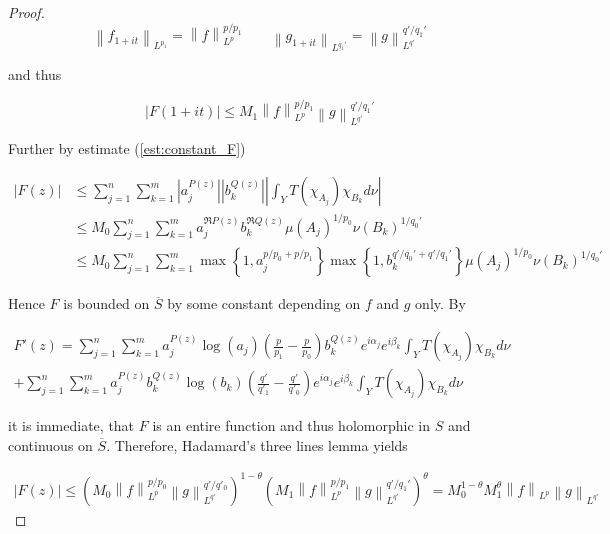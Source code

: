\begin{proof}
\begin{equation*}
	\left\|f_{1 + it}\right\|_{L^{p_1}} = \left\|f\right\|_{L^p}^{p/p_1} \qquad \left\|g_{1 + it}\right\|_{L^{q_1'}} = \left\|g\right\|_{L^{q'}}^{q'/q_1'}
\end{equation*}

and thus 
				
\begin{equation*}
	\left| F(1 + it)\right| \leqslant M_1 \left\|f\right\|_{L^p}^{p/p_1}\left\|g\right\|_{L^{q'}}^{q'/q_1'}
\end{equation*}	

Further by estimate (\ref{est:constant_F}) 

\begin{equation*}
	\begin{aligned}
		\left| F(z)\right| &\leqslant \sum_{j = 1}^n\sum_{k = 1}^m \left| a_j^{P(z)}\right| \left| b_k^{Q(z)}\right| \left| \int_Y T(\chi_{A_j})\chi_{B_k} d\nu\right|\\
		&\leqslant M_0\sum_{j = 1}^n\sum_{k = 1}^m a_j^{\Re P(z)}b_k^{\Re Q(z)}\mu\left(A_j\right)^{1/p_0}\nu\left(B_k\right)^{1/q_0'}\\
		&\leqslant M_0\sum_{j = 1}^n\sum_{k = 1}^m \max\left\{ 1, a_j^{p/p_0 + p/p_1}\right\} \max\left\{1,b_k^{q'/q_0' + q'/q_1'}\right\}\mu\left(A_j\right)^{1/p_0}\nu\left(B_k\right)^{1/q_0'}
	\end{aligned}
\end{equation*}


Hence $F$ is bounded on $\overline{S}$ by some constant depending on $f$ and $g$ only. By 

\begin{multline*}
	F'(z) = \sum_{j = 1}^n\sum_{k = 1}^m a^{P(z)}_j\log \left( a_j \right) \left( \frac{p}{p_1} - \frac{p}{p_0} \right) b_k^{Q(z)}e^{i\alpha_j} e^{i\beta_k} \int_YT(\chi_{A_j})\chi_{B_k}d\nu \\
	+  \sum_{j = 1}^n\sum_{k = 1}^m a^{P(z)}_jb_k^{Q(z)}\log\left( b_k \right)\left( \frac{q'}{q'_1} - \frac{q'}{q'_0} \right)e^{i\alpha_j} e^{i\beta_k} \int_YT(\chi_{A_j})\chi_{B_k}d\nu 
\end{multline*}

	it is immediate, that $F$ is an entire function and thus holomorphic in $S$ and continuous on $\overline{S}$. Therefore, Hadamard's three lines lemma yields

\begin{gather*}
	\left| F(z) \right| \leqslant \left( M_0  \left\|f\right\|_{L^p}^{p/p_0} \left\|g\right\|_{L^{q'}}^{q'/q'_0} \right)^{1 - \theta}\left(  M_1 \left\|f\right\|_{L^p}^{p/p_1}\left\|g\right\|_{L^{q'}}^{q'/q_1'} \right)^\theta = M_0^{1 - \theta}M_1^\theta \left\|f\right\|_{L^p}\left\|g\right\|_{L^{q'}}
\end{gather*}


\end{proof}

